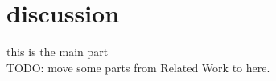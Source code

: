 \section{discussion}
this is the main part \\

{\color{red}TODO: move some parts from Related Work to here.}
